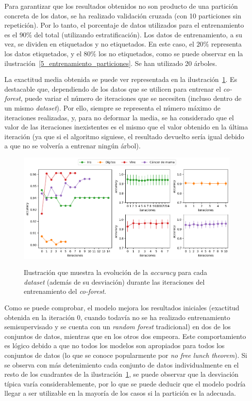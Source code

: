 \begin{itemize}
	Para garantizar que los resultados obtenidos no son producto de una partición concreta de los datos, se ha realizado validación cruzada (con 10 particiones sin repetición). Por lo tanto, el porcentaje de datos utilizados para el entrenamiento es el $90\%$ del total (utilizando estratificación). Los datos de entrenamiento, a su vez, se dividen en etiquetados y no etiquetados. En este caso, el $20\%$ representa los datos etiquetados, y el $80\%$ los no etiquetados, como se puede observar en la ilustración~\ref{5_entrenamiento_particiones}. Se han utilizado 20 árboles.
	
	La exactitud media obtenida se puede ver representada en la ilustración~\ref{gr:cf_train-iterations}. Es destacable que, dependiendo de los datos que se utilicen para entrenar el \textit{co-forest}, puede variar el número de iteraciones que se necesiten (incluso dentro de un mismo \textit{dataset}). Por ello, siempre se representa el número máximo de iteraciones realizadas, y, para no deformar la media, se ha considerado que el valor de las iteraciones inexistentes es el mismo que el valor obtenido en la última iteración (ya que si el algoritmo siguiese, el resultado devuelto sería igual debido a que no se volvería a entrenar ningún árbol).
	
	\begin{figure}[h]
		\caption[\textit{Co-Forest}: resultados (iteraciones-entrenamiento)]{Ilustración que muestra la evolución de la \textit{accuracy} para cada \textit{dataset} (además de su desviación) durante las iteraciones del entrenamiento del \textit{co-forest}.}
		\centering
		\includegraphics[width=\textwidth]{../img/memoria/5_coforest_score-iteraciones}
		\label{gr:cf_train-iterations}
	\end{figure}

	Como se puede comprobar, el modelo mejora los resultados iniciales (exactitud obtenida en la iteración $0$, cuando todavía no se ha realizado entrenamiento semisupervisado y se cuenta con un \textit{random forest} tradicional) en dos de los conjuntos de datos, mientras que en los otros dos empeora. Este comportamiento es lógico debido a que no todos los modelos son apropiados para todos los conjuntos de datos (lo que se conoce popularmente por \textit{no free lunch theorem}). Si se observa con más detenimiento cada conjunto de datos individualmente en el resto de los cuadrantes de la ilustración~\ref{gr:cf_train-iterations}, se puede observar que la desviación típica varía considerablemente, por lo que se puede deducir que el modelo podría llegar a ser utilizable en la mayoría de los casos si la partición es la adecuada.


\end{itemize}
